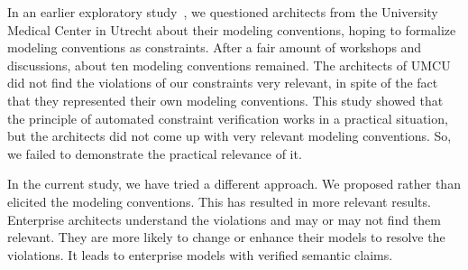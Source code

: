 \documentclass[sn-vancouver]{sn-jnl}%
\begin{document}
In an earlier exploratory study~\cite{iceis22}, we questioned architects from the University Medical Center in Utrecht about their modeling conventions,
hoping to formalize modeling conventions as constraints.
After a fair amount of workshops and discussions, about ten modeling conventions remained.
The architects of UMCU did not find the violations of our constraints very relevant,
in spite of the fact that they represented their own modeling conventions.
This study showed that the principle of automated constraint verification works in a practical situation,
but the architects did not come up with very relevant modeling conventions.
So, we failed to demonstrate the practical relevance of it.

In the current study, we have tried a different approach.
We proposed rather than elicited the modeling conventions.
This has resulted in more relevant results.
Enterprise architects understand the violations and may or may not find them relevant.
They are more likely to change or enhance their models to resolve the violations.
It leads to enterprise models with verified semantic claims.
\end{document}
